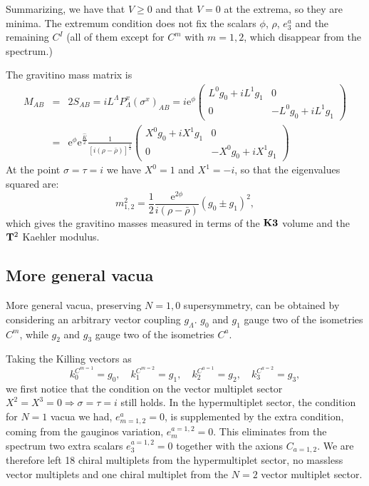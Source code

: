 \documentclass[a4paper,12pt]{article}
\begin{document}
Summarizing,  we have that $V\geq 0$ and that $V=0$ at the
extrema, so they are minima. The extremum condition does not fix
the scalars $\phi$, $\rho$, $e_3^a$ and the remaining $C^I$ (all
of them  except for $C^m$ with $m=1,2$, which disappear from the
spectrum.)






\bigskip
 The gravitino mass matrix is
\begin{eqnarray*} M_{AB} &=& 2S_{AB}= i  L^\Lambda P_\Lambda^x(\sigma^x)_{AB} =
i
\mathrm{e}^\phi \begin{pmatrix}
L^0 g_0 + i L^1 g_1 &0 \\
0 & -L^0 g_0 + i L^1 g_1 \end{pmatrix}\\
&=& \mathrm{e}^\phi \mathrm{e}^{\frac{\hat K}2} \frac 1{[i(\rho -
\bar \rho )]^{\frac 12}}
\begin{pmatrix}
X^0 g_0 + i X^1 g_1 &0 \\
0 & -X^0 g_0 + i X^1 g_1 \end{pmatrix}
\end{eqnarray*}
At the point $\sigma = \tau = i$ we have $X^0 = 1$ and $X^1 = -i$,
so that the eigenvalues squared are:
$$ m^2_{1,2} = \frac 12 \frac {\mathrm{e}^{2\phi}}{i(\rho -
\bar \rho )} (g_0 \pm g_1)^2,$$ which gives the gravitino masses
measured in terms of the $\mathbf{K3}$ volume and the $\mathbf{T}^2$ Kaehler
modulus.

\subsection{ \label{noscale} More general vacua}
More general vacua, preserving $N=1,0$ supersymmetry, can be
obtained by considering an arbitrary vector coupling $g_\Lambda$.
$g_0$ and $g_1$ gauge two of the isometries $C^m$, while $g_2$ and
$g_3$ gauge two of the isometries $C^a$.

Taking the Killing vectors as
$$k^{C^{m=1}}_0 =g_0, \quad k^{C^{m=2}}_1 =g_1, \quad k^{C^{a=1}}_2 =g_2, \quad k^{C^{a=2}}_3
=g_3,$$ we first notice that the condition on the vector multiplet
sector $X^2=X^3=0\Longrightarrow \sigma=\tau=i$ still holds. In
the hypermultiplet sector, the condition for $N=1$ vacua we had,
$e_{m=1,2}^a=0$, is supplemented by the extra condition, coming
from the gauginos variation, $e^{a=1,2}_m=0$. This eliminates from
the spectrum two extra scalars $e^{a=1,2}_3=0$ together with the
axions $C_{a=1,2}$. We are therefore left 18 chiral multiplets
from the hypermultiplet sector, no massless vector multiplets and
one chiral multiplet from the $N=2$ vector multiplet sector.
\end{document}
